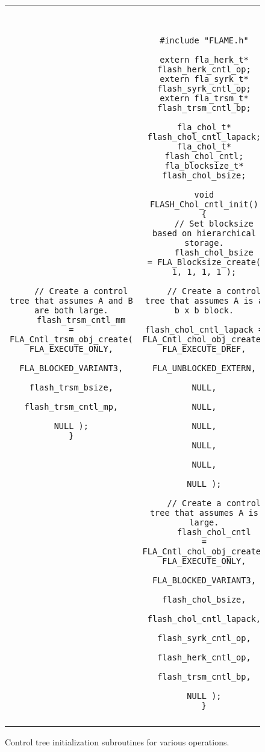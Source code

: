 \begin{figure}[tbp]
\begin{center}
\begin{tabular}{|c|c|}
\begin{minipage}[t]{3in}
{\begin{verbatim}
    // Create a control tree that assumes A and B are both large.
    flash_trsm_cntl_mm    = FLA_Cntl_trsm_obj_create( FLA_EXECUTE_ONLY,
                                                      FLA_BLOCKED_VARIANT3,
                                                      flash_trsm_bsize,
                                                      flash_trsm_cntl_mp,
                                                      NULL );
}
\end{verbatim}
}
\end{minipage}
&
\begin{minipage}[t]{3in}
{\tt \tiny
\begin{verbatim}
#include "FLAME.h"

extern fla_herk_t* flash_herk_cntl_op;
extern fla_syrk_t* flash_syrk_cntl_op;
extern fla_trsm_t* flash_trsm_cntl_bp;

fla_chol_t*        flash_chol_cntl_lapack;
fla_chol_t*        flash_chol_cntl;
fla_blocksize_t*   flash_chol_bsize;

void FLASH_Chol_cntl_init()
{
    // Set blocksize based on hierarchical storage.
    flash_chol_bsize       = FLA_Blocksize_create( 1, 1, 1, 1 );

    // Create a control tree that assumes A is a b x b block.
    flash_chol_cntl_lapack = FLA_Cntl_chol_obj_create( FLA_EXECUTE_DREF,
                                                       FLA_UNBLOCKED_EXTERN,
                                                       NULL,
                                                       NULL,
                                                       NULL,
                                                       NULL,
                                                       NULL,
                                                       NULL );

    // Create a control tree that assumes A is large.
    flash_chol_cntl        = FLA_Cntl_chol_obj_create( FLA_EXECUTE_ONLY,
                                                       FLA_BLOCKED_VARIANT3,
                                                       flash_chol_bsize,
                                                       flash_chol_cntl_lapack,
                                                       flash_syrk_cntl_op,
                                                       flash_herk_cntl_op,
                                                       flash_trsm_cntl_bp,
                                                       NULL );
}
\end{verbatim}
}
\end{minipage}
\\
 & \\ \hline
\end{tabular}
\end{center}
\caption{
Control tree initialization subroutines for various operations.
}
\label{fig:cntl-init}
\end{figure}
